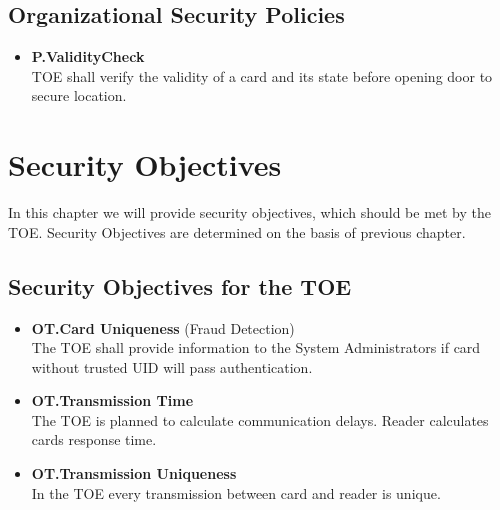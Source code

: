 \documentclass[10pt,titlepage]{article}
\begin{document}
\subsection{Organizational Security Policies}
\begin{itemize}
	\item \textbf{P.ValidityCheck} \\ TOE shall verify the validity of a card and its state before opening door to secure location.
\end{itemize}

\section{Security Objectives}

In this chapter we will provide security objectives, which should be met by the TOE. Security Objectives are determined on the basis of previous chapter.

\subsection{Security Objectives for the TOE}
\begin{itemize}
\item \textbf{OT.Card Uniqueness} (Fraud Detection) \\ The TOE shall provide information to the System Administrators if card without trusted UID will pass authentication.
\item \textbf{OT.Transmission Time} \\The TOE is planned to calculate communication delays. Reader calculates cards response time.
\item \textbf{OT.Transmission Uniqueness} \\ In the TOE every transmission between card and reader is unique.
\end{itemize}
\end{document}
